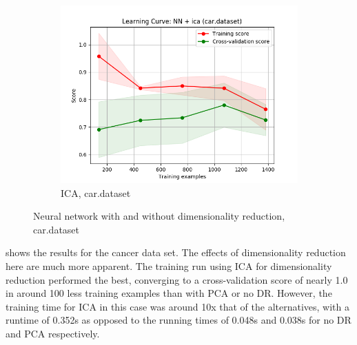 \documentclass{article}
\begin{document}
\begin{figure}[htb]
\begin{subfigure}{0.33\textwidth}
        \includegraphics[width=\linewidth]{out/nn_dr/car-ica-learning.png}
        \caption{ICA, car.dataset}
      \end{subfigure}

    \caption{Neural network with and without dimensionality reduction, car.dataset}
    \label{fig:nndr-plot-car}
    \end{figure}

     shows the results for the cancer data set. The effects of dimensionality reduction here are much more apparent. The training run using ICA for dimensionality reduction performed the best, converging to a cross-validation score of nearly 1.0 in around 100 less training examples than with PCA or no DR. However, the training time for ICA in this case was around 10x that of the alternatives, with a runtime of 0.352s as opposed to the running times of 0.048s and 0.038s for no DR and PCA respectively. 
\end{document}
